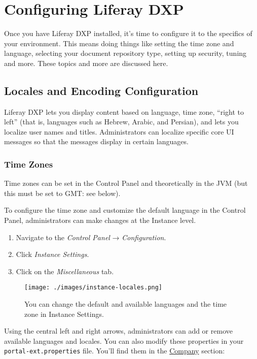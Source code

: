 \chapter{Configuring Liferay DXP}\label{configuring-liferay-dxp}

Once you have Liferay DXP installed, it's time to configure it to the
specifics of your environment. This means doing things like setting the
time zone and language, selecting your document repository type, setting
up security, tuning and more. These topics and more are discussed here.

\section{Locales and Encoding
Configuration}\label{locales-and-encoding-configuration}

Liferay DXP lets you display content based on language, time zone,
``right to left'' (that is, languages such as Hebrew, Arabic, and
Persian), and lets you localize user names and titles. Administrators
can localize specific core UI messages so that the messages display in
certain languages.

\subsection{Time Zones}\label{time-zones}

Time zones can be set in the Control Panel and theoretically in the JVM
(but this must be set to GMT: see below).

To configure the time zone and customize the default language in the
Control Panel, administrators can make changes at the Instance level.

\begin{enumerate}
\def\labelenumi{\arabic{enumi}.}
\item
  Navigate to the \emph{Control Panel} → \emph{Configuration}.
\item
  Click \emph{Instance Settings}.
\item
  Click on the \emph{Miscellaneous} tab.
\end{enumerate}

\begin{figure}
\centering
\texttt{[image: ./images/instance-locales.png]}
\caption{You can change the default and available languages and the time
zone in Instance Settings.}
\end{figure}

Using the central left and right arrows, administrators can add or
remove available languages and locales. You can also modify these
properties in your \texttt{portal-ext.properties} file. You'll find them
in the
\href{@platform-ref@/7.0-latest/propertiesdoc/portal.properties.html\#Company}{Company}
section:

